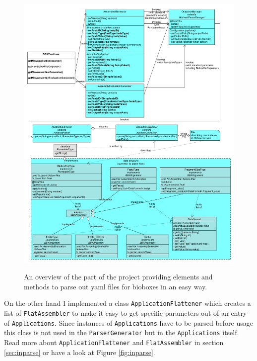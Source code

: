 \documentclass[
	twoside,
	fontsize=12pt,
	headsepline,
	cleardoublepage=empty,
	numbers=noenddot,
	bibliography=totoc,
]{scrbook}
\newcommand{\code}[1]{\texttt{#1}}
\begin{document}
\begin{figure}[h]
	\includegraphics[scale=0.33]{images/outparse.png}
	\label{fig:outparse}
	\caption{An overview of the part of the project providing elements and methods to parse out yaml files for bioboxes in an easy way.}
\end{figure}

On the other hand I implemented a class \code{ApplicationFlattener} which creates a list of \code{FlatAssembler} to make it easy to get specific parameters out of an entry of \code{Applications}. Since instances of \code{Applications} have to be parsed before usage this class is not used in the \code{ParserGenerator} but in the \code{Applications} itself. Read more about \code{ApplicationFlattener} and \code{FlatAssembler} in section \ref{sec:inparse} or have a look at Figure \ref{fig:inparse}.
\end{document}
